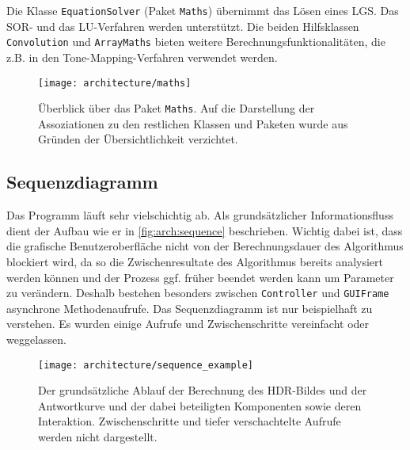 Die Klasse \texttt{EquationSolver} (Paket \texttt{Maths}) übernimmt das Lösen eines \gls{LGS}. Das \gls{SOR}- und das LU-Verfahren werden unterstützt. Die beiden Hilfsklassen \texttt{Convolution} und \texttt{ArrayMaths} bieten weitere Berechnungsfunktionalitäten, die z.B. in den \gls{Tone-Mapping}-Verfahren verwendet werden. 
\begin{figure}
  \begin{center}
    \texttt{[image: architecture/maths]}
    \caption{Überblick über das Paket \texttt{Maths}. Auf die Darstellung der Assoziationen zu den restlichen Klassen und Paketen wurde aus Gründen der Übersichtlichkeit verzichtet.}
    \label{fig:arch:matrix}
  \end{center}
\end{figure}

\subsection{Sequenzdiagramm}
Das Programm läuft sehr vielschichtig ab. Als grundsätzlicher Informationsfluss dient der Aufbau wie er in \autoref{fig:arch:sequence} beschrieben. Wichtig dabei ist, dass die grafische Benutzeroberfläche nicht von der Berechnungsdauer des Algorithmus blockiert wird, da so die Zwischenresultate des Algorithmus bereits analysiert werden können und der Prozess ggf. früher beendet werden kann um Parameter zu verändern. Deshalb bestehen besonders zwischen \texttt{Controller} und \texttt{GUIFrame} asynchrone Methodenaufrufe. Das Sequenzdiagramm ist nur beispielhaft zu verstehen. Es wurden einige Aufrufe und Zwischenschritte vereinfacht oder weggelassen.
\begin{figure}
  \begin{center}
    \texttt{[image: architecture/sequence\_example]}
    \caption{Der grundsätzliche Ablauf der Berechnung des HDR-Bildes und der Antwortkurve und der dabei beteiligten Komponenten sowie deren Interaktion. Zwischenschritte und tiefer verschachtelte Aufrufe werden nicht dargestellt. }
    \label{fig:arch:sequence}
  \end{center}
\end{figure}


